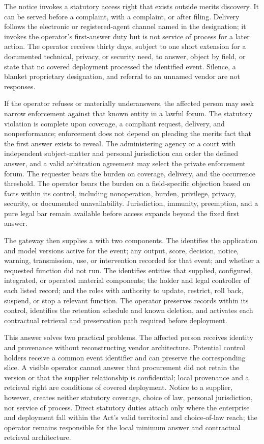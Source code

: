 The notice invokes a statutory access right that exists outside merits discovery. It can be served before a complaint, with a complaint, or after filing. Delivery follows the electronic or registered-agent channel named in the designation; it invokes the operator's first-answer duty but is not service of process for a later action. The operator receives thirty days, subject to one short extension for a documented technical, privacy, or security need, to answer, object by field, or state that no covered deployment processed the identified event. Silence, a blanket proprietary designation, and referral to an unnamed vendor are not responses.

If the operator refuses or materially underanswers, the affected person may seek narrow enforcement against that known entity in a lawful forum. The statutory violation is complete upon coverage, a compliant request, delivery, and nonperformance; enforcement does not depend on pleading the merits fact that the first answer exists to reveal. The administering agency or a court with independent subject-matter and personal jurisdiction can order the defined answer, and a valid arbitration agreement may select the private enforcement forum. The requester bears the burden on coverage, delivery, and the occurrence threshold. The operator bears the burden on a field-specific objection based on facts within its control, including nonoperation, burden, privilege, privacy, security, or documented unavailability. Jurisdiction, immunity, preemption, and a pure legal bar remain available before access expands beyond the fixed first answer.

The gateway then supplies a  with two components. The  identifies the application and model versions active for the event; any output, score, decision, notice, warning, transmission, use, or intervention recorded for that event; and whether a requested function did not run. The  identifies entities that supplied, configured, integrated, or operated material components; the holder and legal controller of each listed record; and the roles with authority to update, restrict, roll back, suspend, or stop a relevant function. The operator preserves records within its control, identifies the retention schedule and known deletion, and activates each contractual retrieval and preservation path required before deployment.

This answer solves two practical problems. The affected person receives identity and provenance without reconstructing vendor architecture. Potential control holders receive a common event identifier and can preserve the corresponding slice. A visible operator cannot answer that procurement did not retain the version or that the supplier relationship is confidential; local provenance and a retrieval right are conditions of covered deployment. Notice to a supplier, however, creates neither statutory coverage, choice of law, personal jurisdiction, nor service of process. Direct statutory duties attach only where the enterprise and deployment fall within the Act's valid territorial and choice-of-law reach; the operator remains responsible for the local minimum answer and contractual retrieval architecture.

